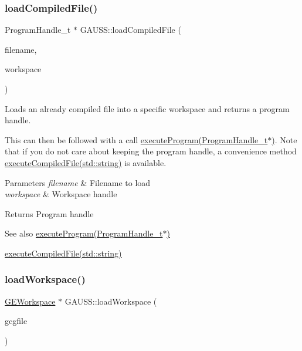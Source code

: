 \subsubsection{\texorpdfstring{load\+Compiled\+File()}{loadCompiledFile()}\hspace{0.1cm}{\footnotesize\ttfamily [2/2]}}
{\footnotesize\ttfamily Program\+Handle\+\_\+t $\ast$ G\+A\+U\+S\+S\+::load\+Compiled\+File (\begin{DoxyParamCaption}\item[{std\+::string}]{filename,  }\item[{\hyperlink{class_g_e_workspace}{G\+E\+Workspace} $\ast$}]{workspace }\end{DoxyParamCaption})}



Loads an already compiled file into a specific workspace and returns a program handle. 

This can then be followed with a call \hyperlink{class_g_a_u_s_s_a7fc9de69421c14aadb9a6310fecabcca}{execute\+Program(\+Program\+Handle\+\_\+t$\ast$)}. Note that if you do not care about keeping the program handle, a convenience method \hyperlink{class_g_a_u_s_s_ac2624100ec1467f7c7b0626973c7e1fc}{execute\+Compiled\+File(std\+::string)} is available.


\begin{DoxyParams}{Parameters}
{\em filename} & Filename to load \\
\hline
{\em workspace} & Workspace handle \\
\hline
\end{DoxyParams}
\begin{DoxyReturn}{Returns}
Program handle
\end{DoxyReturn}
\begin{DoxySeeAlso}{See also}
\hyperlink{class_g_a_u_s_s_a7fc9de69421c14aadb9a6310fecabcca}{execute\+Program(\+Program\+Handle\+\_\+t$\ast$)} 

\hyperlink{class_g_a_u_s_s_ac2624100ec1467f7c7b0626973c7e1fc}{execute\+Compiled\+File(std\+::string)} 
\end{DoxySeeAlso}
\mbox{\label{class_g_a_u_s_s_a7735659dac094c3af6c438011afb2a77}} 
\subsubsection{\texorpdfstring{load\+Workspace()}{loadWorkspace()}}
{\footnotesize\ttfamily \hyperlink{class_g_e_workspace}{G\+E\+Workspace} $\ast$ G\+A\+U\+S\+S\+::load\+Workspace (\begin{DoxyParamCaption}\item[{std\+::string}]{gcgfile }\end{DoxyParamCaption})}



